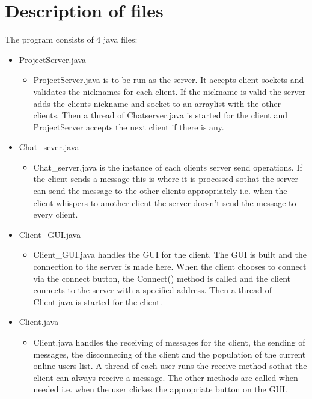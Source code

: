 \documentclass{article}
\begin{document}
\section{Description of files}
The program consists of 4 java files:
\begin{itemize}
	\item ProjectServer.java
	\begin{itemize}
		\item ProjectServer.java is to be run as the server. It accepts client sockets and validates the nicknames
		for each client. If the nickname is valid the server adds the clients nickname and socket to an arraylist with the other
		clients. Then a thread of Chatserver.java is started for the client and ProjectServer accepts the next client if there is any.
	\end{itemize}

	\item Chat\_sever.java
	\begin{itemize}
		\item Chat\_server.java is the instance of each clients server send operations.
		If the client sends a message this is where it is processed sothat the server can send the message to the other clients
		appropriately i.e. when the client whispers to another client the server doesn't send the message to every client. 
	\end{itemize}
	\item Client\_GUI.java
	\begin{itemize}
		\item Client\_GUI.java handles the GUI for the client. The GUI is built and the connection to the server is made here.
		When the client chooses to connect via the connect button, the Connect() method is called and the client connects to
		the server with a specified address. Then a thread of Client.java is started for the client.
	\end{itemize}
	\item Client.java
	\begin{itemize}
		\item Client.java handles the receiving of messages for the client, the sending of messages, the disconnecing of the client 
		and the population of the current online users list. A thread of each user runs the receive method sothat the client 
		can always receive a message. The other methods are called when needed i.e. when the user clickes the appropriate button 
		on the GUI.
	\end{itemize}

\end{itemize}
\end{document}
